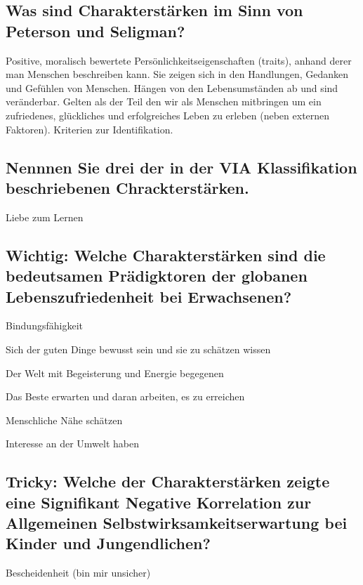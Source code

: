 \documentclass[a6paper,10pt,DIV=40]{scrartcl}
\begin{document}
\subsection{Was sind Charakterstärken im Sinn von Peterson und Seligman?}
Positive, moralisch bewertete Persönlichkeitseigenschaften (traits), anhand derer man Menschen beschreiben kann. Sie zeigen sich in den Handlungen, Gedanken und Gefühlen von Menschen. Hängen von den Lebensumständen ab und sind veränderbar. Gelten als der Teil den wir als Menschen mitbringen um ein zufriedenes, glückliches und erfolgreiches Leben zu erleben (neben externen Faktoren). Kriterien zur Identifikation.
\subsection{Nennnen Sie drei der in der VIA Klassifikation beschriebenen Chrackterstärken.}
\begin{labeling}{Liebe zum Lernen}
\item [Neugier] 
\item [Liebe zum Lernen] 
\item [Tapferkeit] 
\end{labeling}
\subsection{Wichtig: Welche Charakterstärken sind die bedeutsamen Prädigktoren der globanen Lebenszufriedenheit bei Erwachsenen?}
\begin{labeling}{Bindungsfähigkeit}
\item [Dankbarkeit]  Sich der guten Dinge bewusst sein und sie zu schätzen wissen
\item [Tatendrang] Der Welt mit Begeisterung und Energie begegenen
\item [Hoffnung] Das Beste erwarten und daran arbeiten, es zu erreichen
\item [Bindungsfähigkeit] Menschliche Nähe schätzen
\item [Neugier] Interesse an der Umwelt haben
\end{labeling}
\subsection{Tricky: Welche der Charakterstärken zeigte eine Signifikant Negative Korrelation zur Allgemeinen Selbstwirksamkeitserwartung bei Kinder und Jungendlichen?}
Bescheidenheit (bin mir unsicher)

\end{document}
